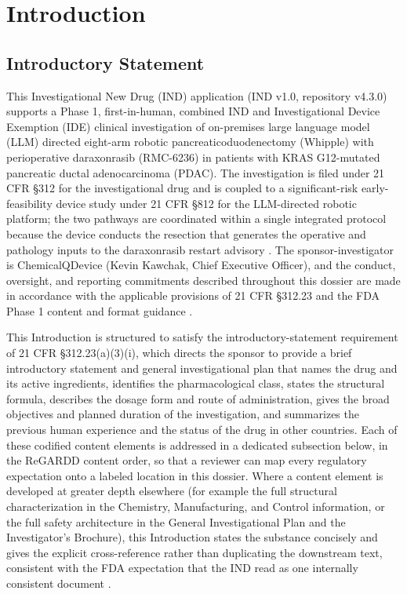 \section{Introduction}

\subsection{Introductory Statement}

This Investigational New Drug (IND) application (IND v1.0, repository v4.3.0)
supports a Phase 1, first-in-human, combined IND and Investigational Device
Exemption (IDE) clinical investigation of on-premises large language model (LLM)
directed eight-arm robotic pancreaticoduodenectomy (Whipple) with perioperative
daraxonrasib (RMC-6236) in patients with KRAS G12-mutated pancreatic ductal
adenocarcinoma (PDAC). The investigation is filed under 21 CFR \S 312 for the
investigational drug and is coupled to a significant-risk early-feasibility device
study under 21 CFR \S 812 for the LLM-directed robotic platform; the two pathways
are coordinated within a single integrated protocol because the device conducts the
resection that generates the operative and pathology inputs to the daraxonrasib
restart advisory \cite{daraxwhipple, onpremwhippl}. The sponsor-investigator is
ChemicalQDevice (Kevin Kawchak, Chief Executive Officer), and the conduct,
oversight, and reporting commitments described throughout this dossier are made in
accordance with the applicable provisions of 21 CFR \S 312.23 and the FDA Phase 1
content and format guidance \cite{phase1guidance, cfr312paiuni}.

This Introduction is structured to satisfy the introductory-statement requirement
of 21 CFR \S 312.23(a)(3)(i), which directs the sponsor to provide a brief
introductory statement and general investigational plan that names the drug and its
active ingredients, identifies the pharmacological class, states the structural
formula, describes the dosage form and route of administration, gives the broad
objectives and planned duration of the investigation, and summarizes the previous
human experience and the status of the drug in other countries. Each of these
codified content elements is addressed in a dedicated subsection below, in the
ReGARDD content order, so that a reviewer can map every regulatory expectation onto
a labeled location in this dossier. Where a content element is developed at greater
depth elsewhere (for example the full structural characterization in the Chemistry,
Manufacturing, and Control information, or the full safety architecture in the
General Investigational Plan and the Investigator's Brochure), this Introduction
states the substance concisely and gives the explicit cross-reference rather than
duplicating the downstream text, consistent with the FDA expectation that the IND
read as one internally consistent document \cite{phase1guidance}.

